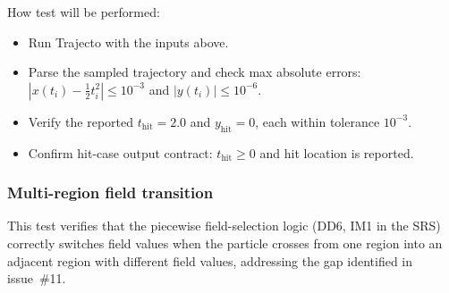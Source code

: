 \documentclass[12pt, titlepage]{article}
\begin{document}
\begin{enumerate}
How test will be performed:
\begin{itemize}
  \item Run Trajecto with the inputs above.
  \item Parse the sampled trajectory and check max absolute errors:
        $|x(t_i)-\tfrac{1}{2}t_i^2|\le 10^{-3}$ and $|y(t_i)|\le 10^{-6}$.
  \item Verify the reported $t_{\mathrm{hit}}=2.0$ and $y_{\mathrm{hit}}=0$,
        each within tolerance $10^{-3}$.
  \item Confirm hit-case output contract:
  $t_{\mathrm{hit}}\ge 0$ and hit location is reported.
\end{itemize}

\end{enumerate}

\subsubsection{Multi-region field transition}

This test verifies that the piecewise field-selection logic (DD6, IM1 in the SRS)
correctly switches field values when the particle crosses from one region into an
adjacent region with different field values, addressing the gap identified in
issue~\#11.
\end{document}

